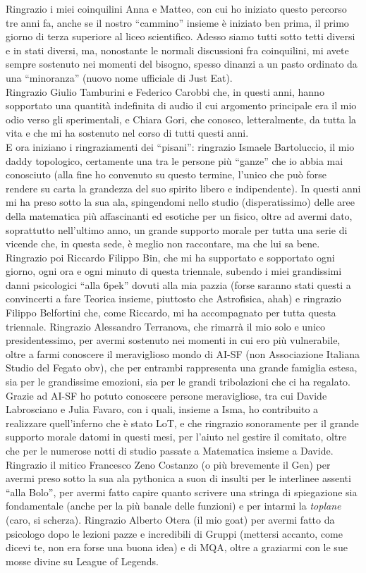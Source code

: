 Ringrazio i miei coinquilini Anna e Matteo, con cui ho iniziato questo percorso tre anni fa, anche se il nostro ``cammino'' insieme è iniziato ben prima, il primo giorno di terza superiore al liceo scientifico. Adesso siamo tutti sotto tetti diversi e in stati diversi, ma, nonostante le normali discussioni fra coinquilini, mi avete sempre sostenuto nei momenti del bisogno, spesso dinanzi a un pasto ordinato da una ``minoranza'' (nuovo nome ufficiale di Just Eat). \\
Ringrazio Giulio Tamburini e Federico Carobbi che, in questi anni, hanno sopportato una quantità indefinita di audio il cui argomento principale era il mio odio verso gli sperimentali, e Chiara Gori, che conosco, letteralmente, da tutta la vita e che mi ha sostenuto nel corso di tutti questi anni. \\
E ora iniziano i ringraziamenti dei ``pisani'': ringrazio Ismaele Bartoluccio, il mio daddy topologico, certamente una tra le persone più ``ganze'' che io abbia mai conosciuto (alla fine ho convenuto su questo termine, l'unico che può forse rendere su carta la grandezza del suo spirito libero e indipendente). In questi anni mi ha preso sotto la sua ala, spingendomi nello studio (disperatissimo) delle aree della matematica più affascinanti ed esotiche per un fisico, oltre ad avermi dato, soprattutto nell'ultimo anno, un grande supporto morale per tutta una serie di vicende che, in questa sede, è meglio non raccontare, ma che lui sa bene. Ringrazio poi Riccardo Filippo Bin, che mi ha supportato e sopportato ogni giorno, ogni ora e ogni minuto di questa triennale, subendo i miei grandissimi danni psicologici ``alla 6pek'' dovuti alla mia pazzia (forse saranno stati questi a convincerti a fare Teorica insieme, piuttosto che Astrofisica, ahah) e ringrazio Filippo Belfortini che, come Riccardo, mi ha accompagnato per tutta questa triennale. Ringrazio Alessandro Terranova, che rimarrà il mio solo e unico presidentessimo, per avermi sostenuto nei momenti in cui ero più vulnerabile, oltre a farmi conoscere il meraviglioso mondo di AI-SF (non Associazione Italiana Studio del Fegato obv), che per entrambi rappresenta una grande famiglia estesa, sia per le grandissime emozioni, sia per le grandi tribolazioni che ci ha regalato. Grazie ad AI-SF ho potuto conoscere persone meravigliose, tra cui Davide Labrosciano e Julia Favaro, con i quali, insieme a Isma, ho contribuito a realizzare quell'inferno che è stato LoT, e che ringrazio sonoramente per il grande supporto morale datomi in questi mesi, per l'aiuto nel gestire il comitato, oltre che per le numerose notti di studio passate a Matematica insieme a Davide. Ringrazio il mitico Francesco Zeno Costanzo (o più brevemente il Gen) per avermi preso sotto la sua ala pythonica a suon di insulti per le interlinee assenti ``alla Bolo'', per avermi fatto capire quanto scrivere una stringa di spiegazione sia fondamentale (anche per la più banale delle funzioni) e per intarmi la \emph{toplane} (caro, si scherza). Ringrazio Alberto Otera (il mio goat) per avermi fatto da psicologo dopo le lezioni pazze e incredibili di Gruppi (mettersi accanto, come dicevi te, non era forse una buona idea) e di MQA, oltre a graziarmi con le sue mosse divine su League of Legends. 